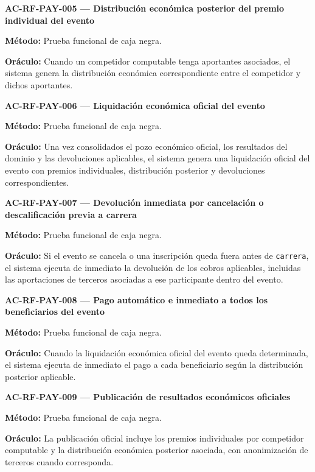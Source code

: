 \documentclass[10pt,letterpaper]{article}
\begin{document}
\noindent\textbf{AC-RF-PAY-005 --- Distribución económica posterior del premio individual del evento}\par
\textbf{Método:} Prueba funcional de caja negra.\par
\textbf{Oráculo:} Cuando un competidor computable tenga aportantes asociados, el sistema genera la distribución económica correspondiente entre el competidor y dichos aportantes.\par\vspace{0.45em}
\noindent\textbf{AC-RF-PAY-006 --- Liquidación económica oficial del evento}\par
\textbf{Método:} Prueba funcional de caja negra.\par
\textbf{Oráculo:} Una vez consolidados el pozo económico oficial, los resultados del dominio y las devoluciones aplicables, el sistema genera una liquidación oficial del evento con premios individuales, distribución posterior y devoluciones correspondientes.\par\vspace{0.45em}
\noindent\textbf{AC-RF-PAY-007 --- Devolución inmediata por cancelación o descalificación previa a carrera}\par
\textbf{Método:} Prueba funcional de caja negra.\par
\textbf{Oráculo:} Si el evento se cancela o una inscripción queda fuera antes de \texttt{carrera}, el sistema ejecuta de inmediato la devolución de los cobros aplicables, incluidas las aportaciones de terceros asociadas a ese participante dentro del evento.\par\vspace{0.45em}
\noindent\textbf{AC-RF-PAY-008 --- Pago automático e inmediato a todos los beneficiarios del evento}\par
\textbf{Método:} Prueba funcional de caja negra.\par
\textbf{Oráculo:} Cuando la liquidación económica oficial del evento queda determinada, el sistema ejecuta de inmediato el pago a cada beneficiario según la distribución posterior aplicable.\par\vspace{0.45em}
\noindent\textbf{AC-RF-PAY-009 --- Publicación de resultados económicos oficiales}\par
\textbf{Método:} Prueba funcional de caja negra.\par
\textbf{Oráculo:} La publicación oficial incluye los premios individuales por competidor computable y la distribución económica posterior asociada, con anonimización de terceros cuando corresponda.\par\vspace{0.45em}
\end{document}
